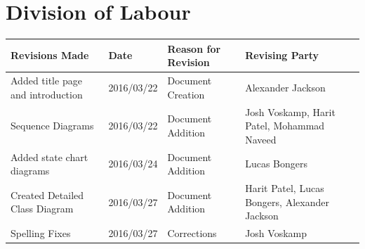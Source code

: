 \documentclass[]{article}
\begin{document}


\newpage
\section*{Division of Labour}
\label{sec:division_of_labour}
\begin{table}[H]
	\centering
	\begin{tabular}{|p{5cm}|p{2cm}|p{3.5cm}|p{3cm}|}\hline
	    \textbf{Revisions Made} & \textbf{Date} & \textbf{Reason for Revision} & \textbf{Revising Party}\\\hline
		Added title page and introduction & 2016/03/22 & Document Creation & Alexander Jackson\\\hline
		Sequence Diagrams & 2016/03/22 & Document Addition & Josh Voskamp, Harit Patel, Mohammad Naveed\\\hline
		Added state chart diagrams & 2016/03/24 & Document Addition & Lucas Bongers\\\hline
		Created Detailed Class Diagram & 2016/03/27 & Document Addition & Harit Patel, Lucas Bongers, Alexander Jackson\\\hline
		Spelling Fixes & 2016/03/27 & Corrections & Josh Voskamp\\\hline
	\end{tabular}
\end{table}
\end{document}
